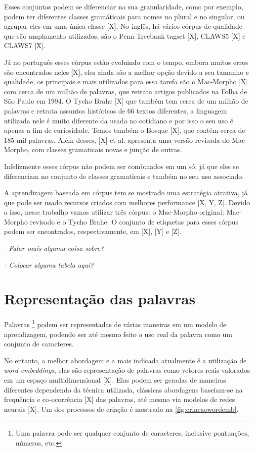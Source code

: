 Esses conjuntos podem se diferenciar na sua granularidade, como por exemplo, podem ter diferentes classes gramáticais para nomes no plural e no singular, ou agrupar eles em uma única classe [X]. No inglês, há vários córpus de qualidade que são amplamento utilizados, são o Penn Treebank tagset [X], CLAWS5 [X] e CLAWS7 [X].

Já no português esses córpus estão evoluindo com o tempo, embora muitos erros são encontrados neles [X], eles ainda são a melhor opção devido a seu tamanho e qualidade, os principais e mais utilizados para essa tarefa são o Mac-Morpho [X] com cerca de um milhão de palavras, que retrata artigos publicados na Folha de São Paulo em 1994. O Tycho Brahe [X] que também tem cerca de um milhão de palavras e retrata assuntos históricos de 66 textos diferentes, a linguagem utilizada nele é muito diferente da usada no cotidiano e por isso o seu uso é apenas a fim de curiosidade. Temos também o Bosque [X], que contém cerca de 185 mil palavras. Além desses, [X] et al. apresenta uma versão revisada do Mac-Morpho, com classes gramaticais novas e junção de outras. 

Infelizmente esses córpus não podem ser combinados em um só, já que eles se diferenciam no conjunto de classes gramaticais e também no seu uso associado.

A aprendizagem baseada em córpus tem se mostrado uma estratégia atrativa, já que pode ser usado recursos criados com melhores performance [X, Y, Z]. Devido a isso, nesse trabalho vamos utilizar três córpus: o Mac-Morpho original; Mac-Morpho revisado e o Tycho Brahe. O conjunto de etiquetas para esses córpus podem ser encontrados, respectivamente, em [X], [Y] e [Z].


\textit{- Falar mais alguma coisa sobre?}

\textit{- Colocar alguma tabela aqui?}



\section{Representação das palavras}

Palavras \footnote{Uma palavra pode ser qualquer conjunto de caracteres, inclusive pontuações, números, etc.} podem ser representadas de várias maneiras em um modelo de aprendizagem, podendo ser até mesmo feito o uso real da palavra como um conjunto de caracteres.

No entanto, a melhor abordagem e a mais indicada atualmente é a utilização de \textit{word embeddings}, elas são representação de palavras como vetores reais valorados em um espaço multidimensional [X]. Elas podem ser geradas de maneiras diferentes dependendo da técnica utilizada, clássicas abordagens baseiam-se na frequência e co-ocorrência [X] das palavras, até mesmo via modelos de redes neurais [X]. Um dos processos de criação é mostrado na \autoref{fig:criacaowordemb}.

